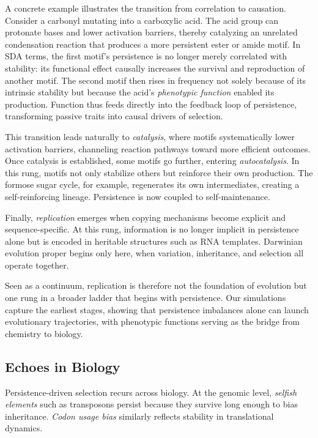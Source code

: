 \documentclass[life,article,submit,pdftex,moreauthors]{Definitions/mdpi}
\begin{document}
A concrete example illustrates the transition from correlation to causation. Consider a carbonyl mutating into a carboxylic acid. The acid group can protonate bases and lower activation barriers, thereby catalyzing an unrelated condensation reaction that produces a more persistent ester or amide motif. In SDA terms, the first motif’s persistence is no longer merely correlated with stability: its functional effect causally increases the survival and reproduction of another motif. The second motif then rises in frequency not solely because of its intrinsic stability but because the acid’s \emph{phenotypic function} enabled its production. Function thus feeds directly into the feedback loop of persistence, transforming passive traits into causal drivers of selection.  

This transition leads naturally to \emph{catalysis}, where motifs systematically lower activation barriers, channeling reaction pathways toward more efficient outcomes. Once catalysis is established, some motifs go further, entering \emph{autocatalysis}. In this rung, motifs not only stabilize others but reinforce their own production. The formose sugar cycle, for example, regenerates its own intermediates, creating a self-reinforcing lineage. Persistence is now coupled to self-maintenance.  

Finally, \emph{replication} emerges when copying mechanisms become explicit and sequence-specific. At this rung, information is no longer implicit in persistence alone but is encoded in heritable structures such as RNA templates. Darwinian evolution proper begins only here, when variation, inheritance, and selection all operate together.  

Seen as a continuum, replication is therefore not the foundation of evolution but one rung in a broader ladder that begins with persistence. Our simulations capture the earliest stages, showing that persistence imbalances alone can launch evolutionary trajectories, with phenotypic functions serving as the bridge from chemistry to biology.


\subsection{Echoes in Biology}  
Persistence-driven selection recurs across biology. At the genomic level, \textit{selfish elements} such as transposons persist because they survive long enough to bias inheritance. 
\textit{Codon usage bias} similarly reflects stability in translational dynamics.  
\end{document}
